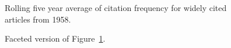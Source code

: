 \documentclass[
  10pt,
  letterpaper,
  DIV=11,
  numbers=noendperiod,
  twoside]{scrartcl}
\begin{document}
\begin{figure}


\caption{\label{fig-citation-spaghetti-1958}Rolling five year average of
citation frequency for widely cited articles from 1958.}

\end{figure}%

\begin{figure}


\caption{\label{fig-citation-facet-1958}Faceted version of
Figure~\ref{fig-citation-spaghetti-1958}.}

\end{figure}%
\end{document}

